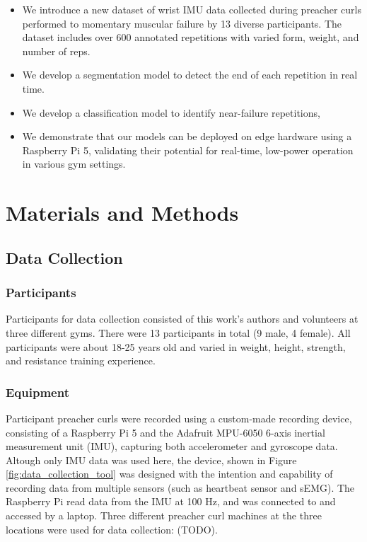 \documentclass[conference]{IEEEtran}
\begin{document}
\begin{itemize}
    \item We introduce a new dataset of wrist IMU data collected during preacher curls performed to momentary muscular failure by 13 diverse participants. The dataset includes over 600 annotated repetitions with varied form, weight, and number of reps.
    \item We develop a segmentation model to detect the end of each repetition in real time.
    \item We develop a classification model to identify near-failure repetitions, 
    \item We demonstrate that our models can be deployed on edge hardware using a Raspberry Pi 5, validating their potential for real-time, low-power operation in various gym settings.
\end{itemize}

\section{Materials and Methods}
\subsection{Data Collection}
\subsubsection{Participants}
Participants for data collection consisted of this work's authors and volunteers at three different gyms. There were 13 participants in total (9 male, 4 female). All participants were about 18-25 years old and varied in weight, height, strength, and resistance training experience.

\subsubsection{Equipment}
Participant preacher curls were recorded using a custom-made recording device, consisting of a Raspberry Pi 5 and the Adafruit MPU-6050 6-axis inertial measurement unit (IMU), capturing both accelerometer and gyroscope data. Altough only IMU data was used here, the device, shown in Figure \ref{fig:data_collection_tool} was designed with the intention and capability of recording data from multiple sensors (such as heartbeat sensor and sEMG). The Raspberry Pi read data from the IMU at 100 Hz, and was connected to and accessed by a laptop. Three different preacher curl machines at the three locations were used for data collection: (TODO).
\end{document}
